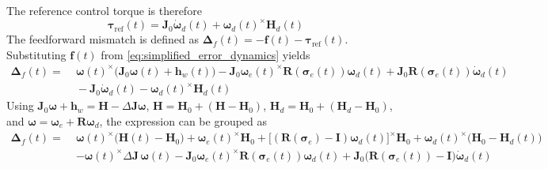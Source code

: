 \documentclass[journal]{new-aiaa}
\begin{document}
The reference control torque is therefore
\begin{equation}
\boldsymbol{\tau}_{\mathrm{ref}}(t) = \boldsymbol{J}_0\dot{\boldsymbol{\omega}}_d(t) + \boldsymbol{\omega}_d(t)^{\times} \boldsymbol{H}_d(t)
\end{equation}
The feedforward mismatch is defined as $\boldsymbol{\Delta}_f(t) = -\boldsymbol{f}(t) - \boldsymbol{\tau}_{\mathrm{ref}}(t)$.
Substituting $\boldsymbol{f}(t)$ from \eqref{eq:simplified_error_dynamics} yields
\begin{align}
\boldsymbol{\Delta}_f(t)
=&\; \boldsymbol{\omega}(t)^{\times} \big(\boldsymbol{J}_0 \boldsymbol{\omega}(t) + \boldsymbol{h}_w(t)\big)
- \boldsymbol{J}_0 \boldsymbol{\omega}_e(t)^{\times} \boldsymbol{R}(\boldsymbol{\sigma}_e(t)) \boldsymbol{\omega}_d(t)
+ \boldsymbol{J}_0 \boldsymbol{R}(\boldsymbol{\sigma}_e(t)) \dot{\boldsymbol{\omega}}_d(t) \nonumber \\
&\; - \boldsymbol{J}_0 \dot{\boldsymbol{\omega}}_d(t) - \boldsymbol{\omega}_d(t)^{\times} \boldsymbol{H}_d(t)
\end{align}
Using $\boldsymbol{J}_0\boldsymbol{\omega}+\boldsymbol{h}_w = \boldsymbol{H} - \Delta\boldsymbol{J}\boldsymbol{\omega}$,
$\boldsymbol{H} = \boldsymbol{H}_0+(\boldsymbol{H}-\boldsymbol{H}_0)$, $\boldsymbol{H}_d = \boldsymbol{H}_0+(\boldsymbol{H}_d-\boldsymbol{H}_0)$, and $\boldsymbol{\omega} = \boldsymbol{\omega}_e + \boldsymbol{R}\boldsymbol{\omega}_d$,
the expression can be grouped as
\begin{align}
\boldsymbol{\Delta}_f(t)
=\;& \boldsymbol{\omega}(t)^{\times} \big( \boldsymbol{H}(t) - \boldsymbol{H}_0 \big)
+ \boldsymbol{\omega}_e(t)^{\times} \boldsymbol{H}_0
+ \big[(\boldsymbol{R}(\boldsymbol{\sigma}_e)-\boldsymbol{I})\boldsymbol{\omega}_d(t)\big]^{\times} \boldsymbol{H}_0
+ \boldsymbol{\omega}_d(t)^{\times}\big(\boldsymbol{H}_0 - \boldsymbol{H}_d(t)\big) \nonumber \\
&- \boldsymbol{\omega}(t)^{\times} \Delta\boldsymbol{J}\,\boldsymbol{\omega}(t)
- \boldsymbol{J}_0 \boldsymbol{\omega}_e(t)^{\times} \boldsymbol{R}(\boldsymbol{\sigma}_e(t)) \boldsymbol{\omega}_d(t)
+ \boldsymbol{J}_0 \big( \boldsymbol{R}(\boldsymbol{\sigma}_e(t)) - \boldsymbol{I} \big) \dot{\boldsymbol{\omega}}_d(t)
\end{align}
\end{document}
